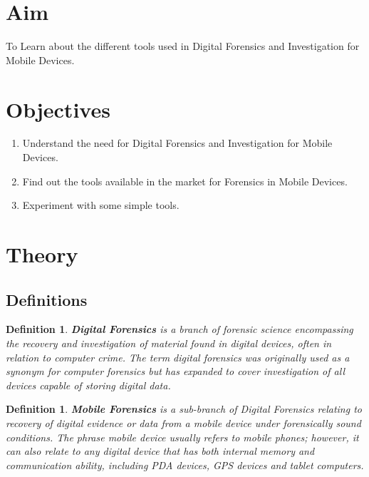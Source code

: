\documentclass[11pt]{article}
\newtheorem{dfn}[thm]{Definition}
\begin{document}
\tableofcontents
\thispagestyle{empty}
\clearpage

\setcounter{page}{1}

\section{Aim}
To Learn about the different tools used in Digital Forensics and Investigation for Mobile Devices.

\section{Objectives}
\begin{enumerate}
    \item Understand the need for Digital Forensics and Investigation for Mobile Devices.
    \item Find out the tools available in the market for Forensics in Mobile Devices.
    \item Experiment with some simple tools.
\end{enumerate}

\section{Theory}

\subsection{Definitions}

\begin{dfn}
    \textbf{Digital Forensics} is a branch of forensic science encompassing the recovery and investigation of material found in digital devices, often in relation to computer crime. The term digital forensics was originally used as a synonym for computer forensics but has expanded to cover investigation of all devices capable of storing digital data.
\end{dfn}

\begin{dfn}
    \textbf{Mobile Forensics} is a sub-branch of Digital Forensics relating to recovery of digital evidence or data from a mobile device under forensically sound conditions. The phrase mobile device usually refers to mobile phones; however, it can also relate to any digital device that has both internal memory and communication ability, including PDA devices, GPS devices and tablet computers.
\end{dfn}
\end{document}
